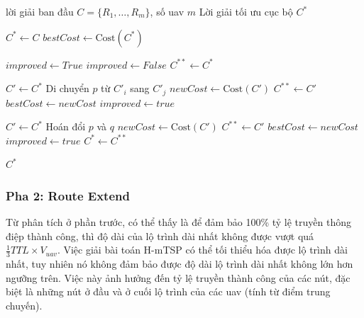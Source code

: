 \documentclass[a4paper]{article}
\begin{document}
\begin{algorithm}
\caption{Local Search H-mTSP}
\label{alg:local_search_hmtsp}
\begin{algorithmic}[1]

\Require lời giải ban đầu $C = \{R_1, \dots, R_m\}$, số uav $m$
\Ensure Lời giải tối ưu cục bộ $C^*$

\State $C^* \gets C$
\State $bestCost \gets \text{Cost}(C^*)$

\State $improved \gets True$
    \State $improved \gets False$
    \State $C^{**} \gets C^*$

                \State $C' \gets C^*$
                \State Di chuyển $p$ từ $C'_i$ sang $C'_j$ 
                \State $newCost \gets \text{Cost}(C')$
                    \State $C^{**} \gets C'$
                    \State $bestCost \gets newCost$
                    \State $improved \gets true$
                \EndIf
            \EndFor
        \EndFor
    \EndFor

                    \State $C' \gets C^*$
                    \State Hoán đổi $p$ và $q$
                    \State $newCost \gets \text{Cost}(C')$
                        \State $C^{**} \gets C'$
                        \State $bestCost \gets newCost$
                        \State $improved \gets true$
                    \EndIf
                \EndFor
            \EndFor
        \EndFor
    \EndFor
    \State $C^* \gets C^{**}$
\EndWhile

\State \Return $C^*$

\end{algorithmic}
\end{algorithm}

\subsubsection{Pha 2: Route Extend}

Từ phân tích ở phần trước, có thể thấy là để đảm bảo 100\% tỷ lệ truyền thông điệp thành công, thì độ dài của lộ trình dài nhất không được vượt quá $\frac 1 3 TTL \times V_{uav}$. 
Việc giải bài toán H-mTSP có thể tối thiểu hóa được lộ trình dài nhất, tuy nhiên nó không đảm bảo được độ dài lộ trình dài nhất không lớn hơn ngưỡng trên.
Việc này ảnh hưởng đến tỷ lệ truyền thành công của các nút, đặc biệt là những nút ở đầu và ở cuối lộ trình của các uav (tính từ điểm trung chuyến).
\end{document}
